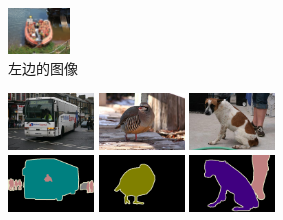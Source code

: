 \begin{figure}[h!]
\begin{subfigure}{0.55\textwidth}
		\includegraphics[width=0.18\textwidth]{image/chap04/result/compare/2007_004241.jpg}
		\caption{左边的图像}
		\label{fig:compare1}
	\end{subfigure}
	\begin{subfigure}{0.4\textwidth}
		\centering
		\includegraphics[width=0.25\textwidth]{image/chap04/result/compare/2010_005284.jpg}
		\includegraphics[width=0.25\textwidth]{image/chap04/result/compare/2007_003349.jpg}
		\includegraphics[width=0.25\textwidth]{image/chap04/result/compare/2009_004507.jpg} 
		\\
		\includegraphics[width=0.25\textwidth]{image/chap04/result/compare/2010_005284.png}
		\includegraphics[width=0.25\textwidth]{image/chap04/result/compare/2007_003349.png}
		\includegraphics[width=0.25\textwidth]{image/chap04/result/compare/2009_004507.png} \\

\end{subfigure}
\end{figure}
